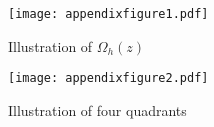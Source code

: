 \documentclass[11pt]{amsart}
\numberwithin{equation}{section}
\theoremstyle{definition}
\begin{document}
\begin{figure}
\vspace{-110pt}
\centerline{\texttt{[image: appendixfigure1.pdf]}}
\vspace{-110pt}
  \caption{Illustration of $\Omega_h(z)$}
  \label{Fig1}
\end{figure}%
\begin{figure}
 \centerline{\texttt{[image: appendixfigure2.pdf]}}
\vspace{-30pt}
  \caption{Illustration of four quadrants}
  \label{Fig2}
\end{figure}


 

{}

\end{document}
